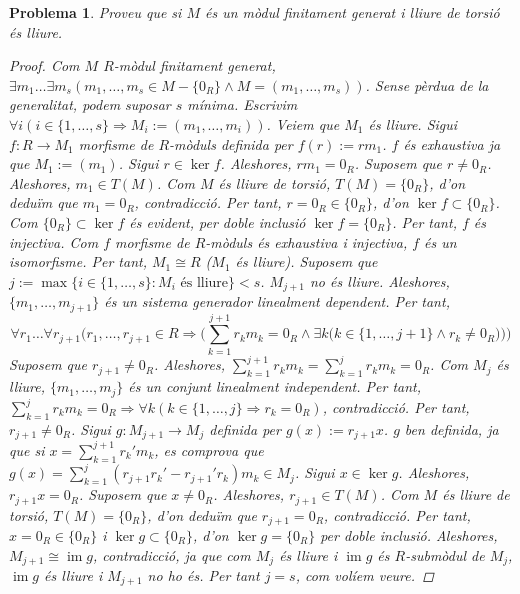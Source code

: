 \documentclass[compress]{article}
\newtheorem{problema}{Problema}
\theoremstyle{definition}
\DeclareMathOperator{\im}{im}
\begin{document}
\begin{problema}
    Proveu que si $M$ és un mòdul finitament generat i lliure de torsió és lliure.
    \begin{proof}
        Com $M$ $R$-mòdul finitament generat, $\exists m_{1}\ldots\exists m_{s}(m_{1},\ldots,m_{s}\in M-\{0_{R}\}\land M=(m_{1},\ldots,m_{s}))$. Sense pèrdua de la generalitat, podem suposar $s$ mínima. Escrivim $\forall i(i\in\{1,\ldots,s\}\Rightarrow M_{i}:=(m_{1},\ldots,m_{i}))$.\newline
        Veiem que $M_{1}$ és lliure. Sigui $f:R\rightarrow M_{1}$ morfisme de $R$-mòduls definida per $f(r):=rm_{1}$. $f$ és exhaustiva ja que $M_{1}:=(m_{1})$. Sigui $r\in\ker{f}$. Aleshores, $rm_{1}=0_{R}$. Suposem que $r\neq0_{R}$. Aleshores, $m_{1}\in T(M)$. Com $M$ és lliure de torsió, $T(M)=\{0_{R}\}$, d'on deduïm que $m_{1}=0_{R}$, contradicció. Per tant, $r=0_{R}\in\{0_{R}\}$, d'on $\ker{f}\subset\{0_{R}\}$. Com $\{0_{R}\}\subset\ker{f}$ és evident, per doble inclusió $\ker{f}=\{0_{R}\}$. Per tant, $f$ és injectiva. Com $f$ morfisme de $R$-mòduls és exhaustiva i injectiva, $f$ és un isomorfisme. Per tant, $M_{1}\cong R$ ($M_{1}$ és lliure).\newline
        Suposem que $j:=\max\{i\in\{1,\ldots,s\}:M_{i}\textrm{ és lliure}\}<s$. $M_{j+1}$ no és lliure. Aleshores, $\{m_{1},\ldots,m_{j+1}\}$ és un sistema generador linealment dependent. Per tant,
        \begin{equation*}
            \forall r_{1}\ldots\forall r_{j+1}\Big(r_{1},\ldots,r_{j+1}\in R\Rightarrow\Big(\sum_{k=1}^{j+1}r_{k}m_{k}=0_{R}\land\exists k\Big(k\in\{1,\ldots,j+1\}\land r_{k}\neq0_{R}\Big)\Big)\Big)
        \end{equation*}
        Suposem que $r_{j+1}\neq0_{R}$. Aleshores, $\sum_{k=1}^{j+1}r_{k}m_{k}=\sum_{k=1}^{j}r_{k}m_{k}=0_{R}$. Com $M_{j}$ és lliure, $\{m_{1},\ldots,m_{j}\}$ és un conjunt linealment independent. Per tant, $\sum_{k=1}^{j}r_{k}m_{k}=0_{R}\Rightarrow\forall k(k\in\{1,\ldots,j\}\Rightarrow r_{k}=0_{R})$, contradicció. Per tant, $r_{j+1}\neq0_{R}$.\newline
        Sigui $g:M_{j+1}\rightarrow M_{j}$ definida per $g(x):=r_{j+1}x$. $g$ ben definida, ja que si $x=\sum_{k=1}^{j+1}r_{k}'m_{k}$, es comprova que $g(x)=\sum_{k=1}^{j}(r_{j+1}r_{k}'-r_{j+1}'r_{k})m_{k}\in M_{j}$. Sigui $x\in\ker{g}$. Aleshores, $r_{j+1}x=0_{R}$. Suposem que $x\neq0_{R}$. Aleshores, $r_{j+1}\in T(M)$. Com $M$ és lliure de torsió, $T(M)=\{0_{R}\}$, d'on deduïm que $r_{j+1}=0_{R}$, contradicció. Per tant, $x=0_{R}\in\{0_{R}\}$ i $\ker{g}\subset\{0_{R}\}$, d'on $\ker{g}=\{0_{R}\}$ per doble inclusió. Aleshores, $M_{j+1}\cong\im{g}$, contradicció, ja que com $M_{j}$ és lliure i $\im{g}$ és $R$-submòdul de $M_{j}$, $\im{g}$ és lliure i $M_{j+1}$ no ho és. Per tant $j=s$, com volíem veure.
    \end{proof}
\end{problema}
\end{document}

